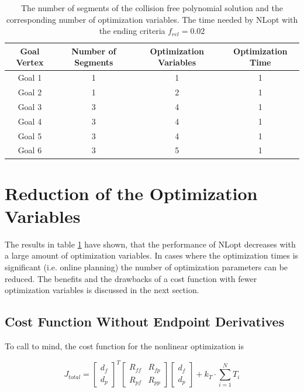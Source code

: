 \begin{table}[H] 
\begin{center}
    \begin{tabular}{| c | c | c | c | }
    \hline
    Goal Vertex & Number of Segments & Optimization Variables & Optimization Time\\ \hline
   Goal 1 & 1 & 1 & 1\\ \hline
  Goal 2 & 1 & 2& 1\\ \hline
   Goal 3 & 3 & 4& 1\\ \hline
Goal 4 & 3 & 4& 1\\ \hline
Goal 5 & 3 & 4& 1\\ \hline
   Goal 6& 3 & 5& 1\\
    \hline
    \end{tabular}
    \caption{The number of segments of the collision free polynomial solution and the corresponding number of optimization variables. The time needed by NLopt with the ending criteria $f_{rel} = 0.02$}
    \label{tab:MLoptimizationTime}
\end{center}
\end{table}

\section{Reduction of the Optimization Variables}

The results in table \ref{tab:MLoptimizationTime} have shown, that the performance of NLopt decreases with a large amount of optimization variables. In cases where the optimization times is significant (i.e. online planning) the number of optimization parameters can be reduced. The benefits and the drawbacks of a cost function with fewer optimization variables is discussed in the next section.

\newpage

\subsection{Cost Function Without Endpoint Derivatives}

To call to mind, the cost function for the nonlinear optimization is 

\begin{equation}
J_{total} =
\begin{bmatrix}
   d_f \\
  d_p
\end{bmatrix}^T
\begin{bmatrix}
   R_{ff} & R_{fp} \\
  R_{pf} & R_{pp}
\end{bmatrix}
\begin{bmatrix}
   d_f \\
  d_p
\end{bmatrix}
+ k_T \cdot \sum_{i=1}^N T_i
\label{equ:total_cost_Result}
\end{equation}

